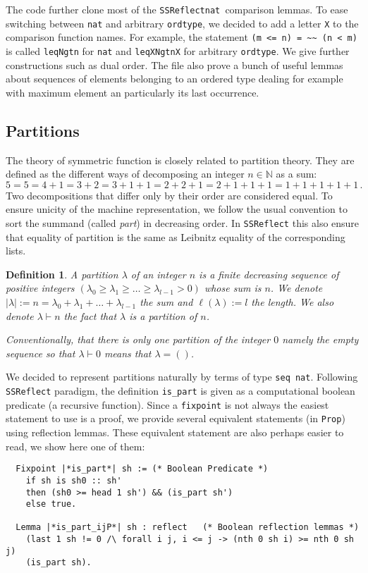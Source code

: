 \documentclass[12pt,a4paper]{article}
\let\verb=\lstinline
\newcommand{\SSR}{\texttt{SSReflect}\xspace}
\newcommand{\N}{{\mathbb N}}
\newcommand{\partof}{\vdash}                    % Partition de
\newtheorem{DEFN}{Definition}
\begin{document}
The code further clone most of the \SSR \verb|nat |comparison lemmas. To
ease switching between \verb|nat| and arbitrary \verb|ordtype|, we
decided to add a letter \verb|X| to the comparison function names. For
example, the statement \verb|(m <= n) = ~~ (n < m)| is called
\verb|leqNgtn| for \verb|nat| and \verb|leqXNgtnX| for
arbitrary \verb|ordtype|. We give further constructions such as dual
order. The file also prove a bunch of useful lemmas about sequences of elements
belonging to an ordered type dealing for example with maximum element an
particularly its last occurrence.

\subsection{Partitions}

The theory of symmetric function is closely related to partition theory. They
are defined as the different ways of decomposing an integer $n\in\N$ as a sum:
\[ 5=5=4+1=3+2=3+1+1=2+2+1=2+1+1+1=1+1+1+1+1\,. \] Two decompositions that
differ only by their order are considered equal. To ensure unicity of the
machine representation, we follow the usual convention to sort the summand
(called \emph{part}) in decreasing order. In \SSR this also ensure that
equality of partition is the same as Leibnitz equality of the corresponding
lists.
\begin{DEFN}
  A \emph{partition} $\lambda$ of an integer $n$ is a finite decreasing
  sequence of positive integers
  $(\lambda_0\geq\lambda_1\geq\dots\geq\lambda_{l-1} > 0)$ whose sum is
  $n$. We denote $|\lambda| := n = \lambda_0+\lambda_1+\dots+\lambda_{l-1}$
  the sum and $\ell(\lambda) := l$ the length. We also denote $\lambda\partof
  n$ the fact that $\lambda$ is a partition of $n$.

  Conventionally, that there is only one partition of the integer $0$ namely
  the empty sequence so that $\lambda\partof0$ means that $\lambda = ()$.
\end{DEFN}
We decided to represent partitions naturally by terms of type 
\verb+seq nat+.
Following \SSR paradigm, the definition \verb|is_part| is given as
a computational boolean predicate (a recursive function). Since a
\verb{fixpoint} is not always the easiest statement to use is a proof, we
provide several equivalent statements (in \verb|Prop|) using reflection
lemmas. These equivalent statement are also perhaps easier to read, we show
here one of them:
\begin{lstlisting}
  Fixpoint |*is_part*| sh := (* Boolean Predicate *)
    if sh is sh0 :: sh'
    then (sh0 >= head 1 sh') && (is_part sh')
    else true.

  Lemma |*is_part_ijP*| sh : reflect   (* Boolean reflection lemmas *)
    (last 1 sh != 0 /\ forall i j, i <= j -> (nth 0 sh i) >= nth 0 sh j)
    (is_part sh).
\end{lstlisting}
\end{document}
